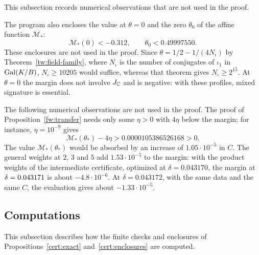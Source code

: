 This subsection records numerical observations that are not used in the
proof.

\begin{remark}\label{cert:signature-remark}
The program also encloses the value at $\theta=0$ and the zero $\theta_0$
of the affine function $\mathcal M_*$:
\[
 \mathcal M_*(0)<-0.312,\qquad \theta_0<0.49997550 .
\]
These enclosures are not used in the proof. Since $\theta=1/2-1/(4N_\iota)$
by Theorem~\ref{tw:field-family}, where $N_\iota$ is the number of conjugates
of $\iota_1$ in $\operatorname{Gal}(K/B)$, $N_\iota\ge10205$ would suffice, whereas that
theorem gives $N_\iota\ge2^{15}$. At $\theta=0$ the margin does not involve
$J_\mathbb C$ and is negative: with these profiles, mixed signature is essential.
\end{remark}

\begin{remark}\label{cert:observations}
The following numerical observations are not used in the proof. The proof of
Proposition~\ref{fw:transfer} needs only some $\eta>0$ with $4\eta$ below the
margin; for instance, $\eta=10^{-9}$ gives
\begin{equation}\label{cert:final-margin}
 \mathcal M_*(\theta_*)-4\eta>0.0000105386526168>0 .
\end{equation}
The value $\mathcal M_*(\theta_*)$ would be absorbed by an increase of
$1.05\cdot10^{-5}$ in $C$. The general weights at $2$, $3$ and $5$ add
$1.53\cdot10^{-5}$ to the margin: with the product weights of the
intermediate certificate, optimized at $\delta=0.043170$, the margin at
$\delta=0.043171$ is about $-4.8\cdot10^{-6}$. At $\delta=0.043172$, with the
same data and the same $C$, the evaluation gives about $-1.33\cdot10^{-5}$.
\end{remark}

\subsection{Computations}\label{cert:computations}
This subsection describes how the finite checks and enclosures of
Propositions~\ref{cert:exact} and~\ref{cert:enclosures} are computed.


